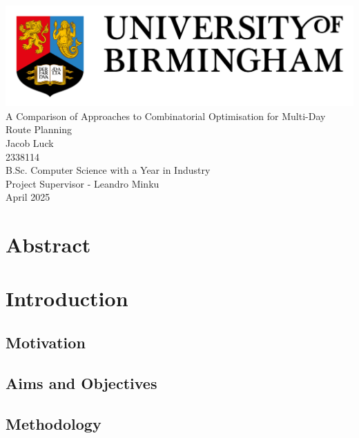 \documentclass[a4paper,12pt]{article}
\begin{document}
    \begin{titlepage}
        \centering
        \includegraphics[width = 1\textwidth]{UoB_Logo}\\[10ex]
        \Huge{A Comparison of Approaches to Combinatorial Optimisation for Multi-Day Route Planning}\\[14ex]
        \LARGE{Jacob Luck}\\
        \large{2338114}\\[2ex]
        \Large{B.Sc. Computer Science with a Year in Industry}\\
        \Large{Project Supervisor - Leandro Minku}\\[2ex]
        \large{April 2025}
    \end{titlepage}

    \section*{Abstract}\label{sec:abstract}

    \pagebreak

    \tableofcontents

    \pagebreak

    \section{Introduction}\label{sec:introduction}
    \subsection{Motivation}\label{subsec:motivation}
    \subsection{Aims and Objectives}\label{subsec:aims-and-objectives}
    \subsection{Methodology}\label{subsec:methodology}
\end{document}
